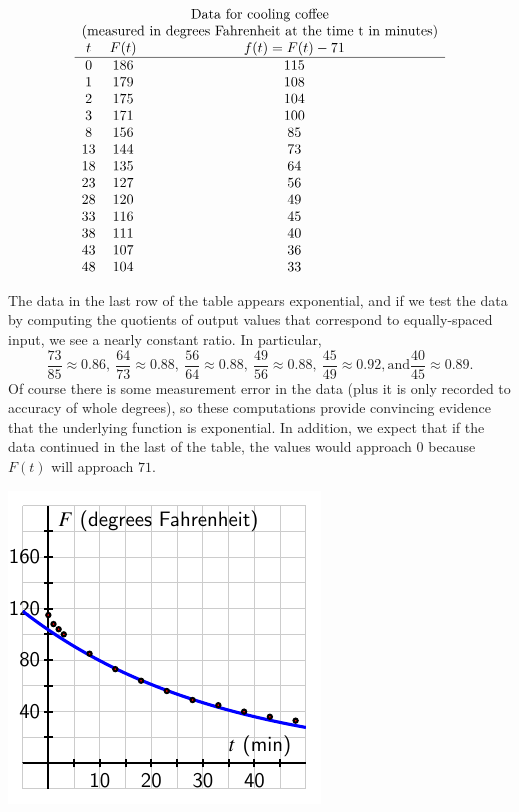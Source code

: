 \documentclass[nooutcomes]{ximera}
\begin{document}
$$
\begin{array}{ccc}
\multicolumn{3}{c}{\text{Data for cooling coffee}}\\
\multicolumn{3}{c}{\text{(measured in degrees Fahrenheit at the time t in minutes)}}\\
t&F(t)&f(t)=F(t)-71\\
\hline
0&186&115\\
1&179&108\\
2&175&104\\
3&171&100\\
8&156&85\\
13&144&73\\
18&135&64\\
23&127&56\\
28&120&49\\
33&116&45\\
38&111&40\\
43&107&36\\
48&104&33
\end{array}
$$

The data in the last row of the table appears exponential, and if we test the data by computing the quotients of output values that correspond to equally-spaced input, we see a nearly constant ratio.  In particular,%
\begin{equation*}
\frac{73}{85} \approx 0.86, \ \frac{64}{73} \approx 0.88, \ \frac{56}{64} \approx 0.88, \ \frac{49}{56} \approx 0.88, \ \frac{45}{49} \approx 0.92, \text{and} \frac{40}{45} \approx 0.89 \text{.}
\end{equation*}
Of course there is some measurement error in the data (plus it is only recorded to accuracy of whole degrees), so these computations provide convincing evidence that the underlying function is exponential.  In addition, we expect that if the data continued in the last of the table, the values would approach \(0\) because \(F(t)\) will approach \(71\).

\begin{image}
\includegraphics{modeling-coffee-shifted}
\end{image}
\end{document}
